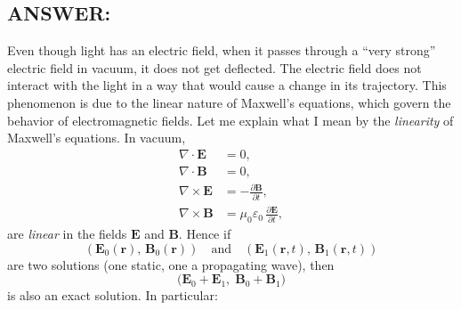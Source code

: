 \documentclass[12pt]{article}
\begin{document}
\subsection*{ANSWER:}
Even though light has an electric field, when it passes through a ``very strong'' electric field in vacuum, it does not get deflected. The electric field does not interact with the light in a way that would cause a change in its trajectory. This phenomenon is due to the linear nature of Maxwell's equations, which govern the behavior of electromagnetic fields. Let me explain what I mean by the \emph{linearity} of Maxwell’s equations.  In vacuum,
\[
\begin{aligned}
\nabla\cdot\mathbf{E} &= 0,\\
\nabla\cdot\mathbf{B} &= 0,\\
\nabla\times\mathbf{E} &= -\frac{\partial\mathbf{B}}{\partial t},\\
\nabla\times\mathbf{B} &= \mu_0\varepsilon_0\,\frac{\partial\mathbf{E}}{\partial t},
\end{aligned}
\]
are \emph{linear} in the fields \(\mathbf{E}\) and \(\mathbf{B}\).  Hence if
\[
(\mathbf{E}_0(\mathbf{r}),\,\mathbf{B}_0(\mathbf{r}))
\quad\text{and}\quad
(\mathbf{E}_1(\mathbf{r},t),\,\mathbf{B}_1(\mathbf{r},t))
\]
are two solutions (one static, one a propagating wave), then
\[
\bigl(\mathbf{E}_0 + \mathbf{E}_1,\;\mathbf{B}_0 + \mathbf{B}_1\bigr)
\]
is also an exact solution.  In particular:
\end{document}
